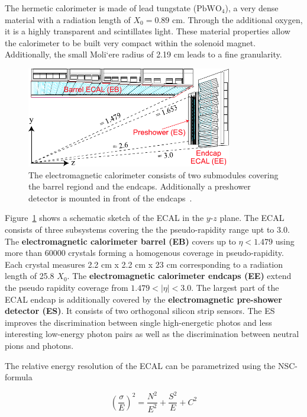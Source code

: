 The hermetic calorimeter is made of lead tungstate ($\mathrm{PbWO}_4$), a very
dense material with a radiation length of $X_0 = 0.89$ cm. Through the
additional oxygen, it is a highly transparent and scintillates light. These
material properties allow the calorimeter to be built very compact within the
solenoid magnet. Additionally, the small Moli`ere  radius of 2.19 cm leads to a
fine granularity. 

\begin{figure}[htp]
    \centering
    \includegraphics[width=0.8\textwidth]{figures/cms_detector/cms_ecal.pdf}\hfill
    \caption[Electromagnetic Calorimeter]{The electromagnetic calorimeter
    consists of two submodules covering the barrel regiond and the endcaps.
    Additionally a preshower detector is mounted in front of the
    endcaps~\cite{cms:ecal}.}
    \label{fig:cms:ecal}
\end{figure}

Figure~\ref{fig:cms:ecal} shows a schematic sketch of the ECAL in the $y$-$z$
plane. The ECAL consists of three subsystems covering the the pseudo-rapidity
range upt to 3.0. The \textbf{electromagnetic calorimeter barrel (EB)} covers up
to $\eta < 1.479$ using more than 60000 crystals forming a homogenous coverage
in pseudo-rapidity. Each crystal measures 2.2 cm x 2.2 cm x 23 cm corresponding
to a radiation length of 25.8 $X_0$. The \textbf{electromagnetic calorimeter
endcaps (EE)} extend the pseudo rapidity coverage from $1.479 < |\eta| < 3.0$.
The largest part of the ECAL endcap is additionally covered by the
\textbf{electromagnetic pre-shower detector (ES)}. It consists of two orthogonal
silicon strip sensors. The ES improves the discrimination between single
high-energetic photos and less interesting low-energy photon pairs as well as
the discrimination between neutral pions and photons.

The relative energy resolution of the ECAL can be parametrized using the NSC-formula

\begin{equation}
    \left( \frac{\sigma}{E} \right)^2 = \frac{N^2}{E^2} + \frac{S^2}{E} + C^2
\end{equation}

